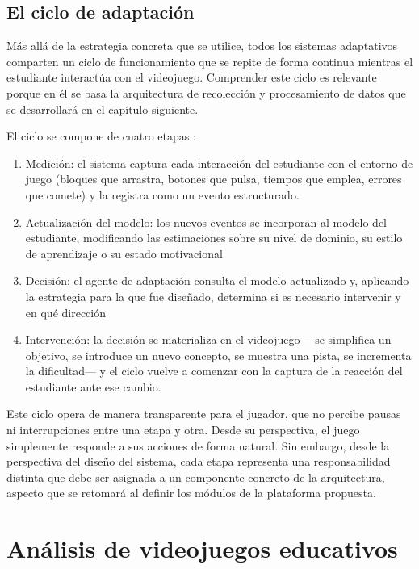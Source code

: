 \subsection{El ciclo de adaptación}

Más allá de la estrategia concreta que se utilice, todos los sistemas adaptativos
comparten un ciclo de funcionamiento que se repite de forma continua mientras el
estudiante interactúa con el videojuego. Comprender este ciclo es relevante porque
en él se basa la arquitectura de recolección y procesamiento de datos que se
desarrollará en el capítulo siguiente.

El ciclo se compone de cuatro etapas \cite{shum_personalised_2023}:

\begin{enumerate}
	\item Medición: el
	sistema captura cada interacción del estudiante con el entorno de juego (bloques
	que arrastra, botones que pulsa, tiempos que emplea, errores que comete) y la
	registra como un evento estructurado.
	
	\item Actualización del modelo: los nuevos eventos se incorporan al modelo del estudiante, modificando las estimaciones sobre su nivel de dominio, su estilo de aprendizaje o su estado motivacional
	
	\item Decisión: el agente de adaptación
	consulta el modelo actualizado y, aplicando la estrategia para la que fue diseñado,
	determina si es necesario intervenir y en qué dirección
	
	\item Intervención: la decisión se materializa en el videojuego —se
	simplifica un objetivo, se introduce un nuevo concepto, se muestra una pista,
	se incrementa la dificultad— y el ciclo vuelve a comenzar con la captura de la
	reacción del estudiante ante ese cambio.
\end{enumerate}

Este ciclo opera de manera transparente para el jugador, que no percibe pausas
ni interrupciones entre una etapa y otra. Desde su perspectiva, el juego
simplemente responde a sus acciones de forma natural. Sin embargo, desde la
perspectiva del diseño del sistema, cada etapa representa una responsabilidad
distinta que debe ser asignada a un componente concreto de la arquitectura,
aspecto que se retomará al definir los módulos de la plataforma propuesta.

\section{Análisis de videojuegos educativos}

